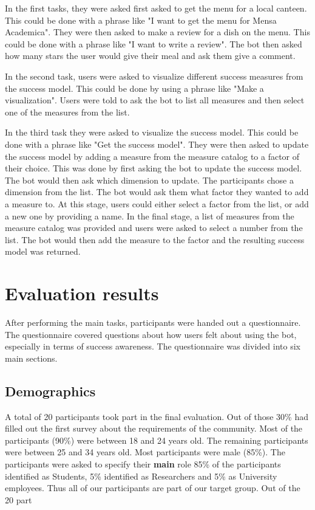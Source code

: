In the first tasks, they were asked first asked to get the menu for a local canteen. This could be done with a phrase like "I want to get the menu for Mensa Academica".
They were then asked to make a review for a dish on the menu. This could be done with a phrase like "I want to write a review". The bot then asked how many stars the user would give their meal and ask them give a comment.  

In the second task, users were asked to visualize different success measures from the success model. This could be done by using a phrase like "Make a visualization". Users were told to ask the bot to list all measures and then select one of the measures from the list.

In the third task they were asked to visualize the success model. This could be done with a phrase like "Get the success model". They were then asked to update the success model by adding a measure from the measure catalog to a factor of their choice. 
This was done by first asking the bot to update the success model. The bot would then ask which dimension to update. 
The participants chose a dimension from the list. 
The bot would ask them what factor they wanted to add a measure to. 
At this stage, users could either select a factor from the list, or add a new one by providing a name. 
In the final stage, a list of measures from the measure catalog was provided and users were asked to select a number from the list. 
The bot would then add the measure to the factor and the resulting success model was returned.

\section{Evaluation results}

After performing the main tasks, participants were handed out a questionnaire.
The questionnaire covered questions about how users felt about using the bot, especially in terms of success awareness. The questionnaire was divided into six main sections. 

\subsection{Demographics}
A total of 20 participants took part in the final evaluation. Out of those 30\% had filled out the first survey about the requirements of the community. 
Most of the participants (90\%) were between 18 and 24 years old. The remaining participants were between 25 and 34 years old. Most participants were male (85\%).
The participants were asked to specify their \textbf{main} role 85\% of the participants identified as Students, 5\% identified as Researchers and 5\% as University employees. Thus all of our participants are part of our target group. Out of the 20 part 

